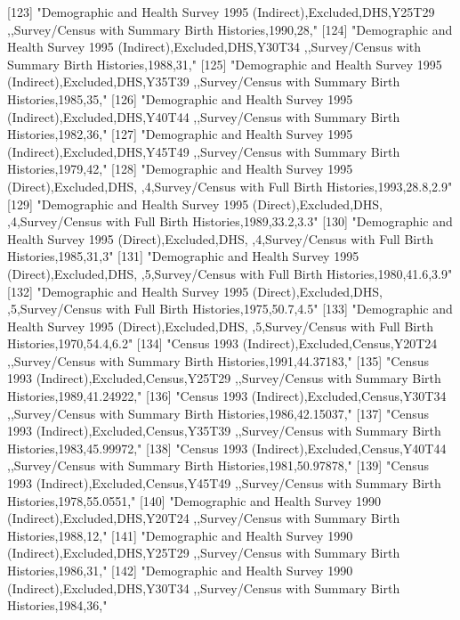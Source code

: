 [123] "Demographic and Health Survey 1995 (Indirect),Excluded,DHS,Y25T29 ,,Survey/Census with Summary Birth Histories,1990,28,"      
[124] "Demographic and Health Survey 1995 (Indirect),Excluded,DHS,Y30T34 ,,Survey/Census with Summary Birth Histories,1988,31,"      
[125] "Demographic and Health Survey 1995 (Indirect),Excluded,DHS,Y35T39 ,,Survey/Census with Summary Birth Histories,1985,35,"      
[126] "Demographic and Health Survey 1995 (Indirect),Excluded,DHS,Y40T44 ,,Survey/Census with Summary Birth Histories,1982,36,"      
[127] "Demographic and Health Survey 1995 (Indirect),Excluded,DHS,Y45T49 ,,Survey/Census with Summary Birth Histories,1979,42,"      
[128] "Demographic and Health Survey 1995 (Direct),Excluded,DHS, ,4,Survey/Census with Full Birth Histories,1993,28.8,2.9"           
[129] "Demographic and Health Survey 1995 (Direct),Excluded,DHS, ,4,Survey/Census with Full Birth Histories,1989,33.2,3.3"           
[130] "Demographic and Health Survey 1995 (Direct),Excluded,DHS, ,4,Survey/Census with Full Birth Histories,1985,31,3"               
[131] "Demographic and Health Survey 1995 (Direct),Excluded,DHS, ,5,Survey/Census with Full Birth Histories,1980,41.6,3.9"           
[132] "Demographic and Health Survey 1995 (Direct),Excluded,DHS, ,5,Survey/Census with Full Birth Histories,1975,50.7,4.5"           
[133] "Demographic and Health Survey 1995 (Direct),Excluded,DHS, ,5,Survey/Census with Full Birth Histories,1970,54.4,6.2"           
[134] "Census 1993 (Indirect),Excluded,Census,Y20T24 ,,Survey/Census with Summary Birth Histories,1991,44.37183,"                    
[135] "Census 1993 (Indirect),Excluded,Census,Y25T29 ,,Survey/Census with Summary Birth Histories,1989,41.24922,"                    
[136] "Census 1993 (Indirect),Excluded,Census,Y30T34 ,,Survey/Census with Summary Birth Histories,1986,42.15037,"                    
[137] "Census 1993 (Indirect),Excluded,Census,Y35T39 ,,Survey/Census with Summary Birth Histories,1983,45.99972,"                    
[138] "Census 1993 (Indirect),Excluded,Census,Y40T44 ,,Survey/Census with Summary Birth Histories,1981,50.97878,"                    
[139] "Census 1993 (Indirect),Excluded,Census,Y45T49 ,,Survey/Census with Summary Birth Histories,1978,55.0551,"                     
[140] "Demographic and Health Survey 1990 (Indirect),Excluded,DHS,Y20T24 ,,Survey/Census with Summary Birth Histories,1988,12,"      
[141] "Demographic and Health Survey 1990 (Indirect),Excluded,DHS,Y25T29 ,,Survey/Census with Summary Birth Histories,1986,31,"      
[142] "Demographic and Health Survey 1990 (Indirect),Excluded,DHS,Y30T34 ,,Survey/Census with Summary Birth Histories,1984,36,"      
